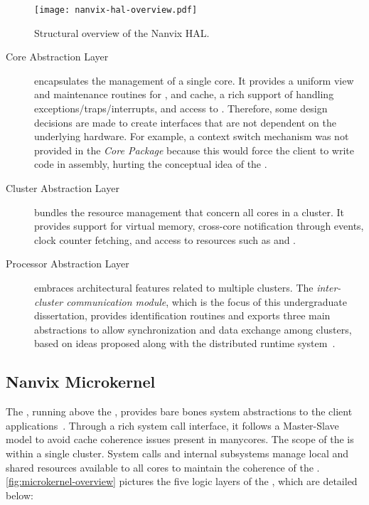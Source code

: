 		\begin{figure}[!tb]
			\centering%
			\caption{Structural overview of the Nanvix HAL.}%
			\label{fig:hal-overview}%
			\texttt{[image: nanvix-hal-overview.pdf]}%
		\end{figure}

		\begin{description}

			\item[Core Abstraction Layer]
				encapsulates the management of a single core.
				It provides a uniform view and maintenance routines for \tlbs, \mmu and cache,
				a rich support of handling exceptions/traps/interrupts, and
				access to \pmio.
				Therefore, some design decisions are made to create interfaces that are not
				dependent on the underlying hardware.
				For example, a context switch mechanism was not provided in the
				\textit{Core Package} because this would force the client \os
				to write code in assembly, hurting the conceptual idea of the \hal.

			\item[Cluster Abstraction Layer]
				bundles the resource management that concern all cores in a cluster.
				It provides support for virtual memory, cross-core notification through events,
				clock counter fetching, and access to \io resources such as \mmio and \dma.

			\item[Processor Abstraction Layer]
				embraces architectural features related to multiple clusters.
				The \textit{inter-cluster communication module}, which is the focus of
				this undergraduate dissertation, provides \noc identification routines and
				exports three main abstractions to allow synchronization and data
				exchange among clusters, based on ideas proposed along with the
				\nodeos distributed runtime system~\cite{DeDinechin2013-1}.

		\end{description}

	\subsection{Nanvix Microkernel}
	\label{sec.microkernel}

		The \textit{\nanvix \microkernel}, running above the \hal, provides
		bare bones system abstractions to the client applications~\cite{penna:sbesc19}.
		Through a rich system call interface, it follows a Master-Slave \os model
		to avoid cache coherence issues present in manycores.
		The scope of the \microkernel is within a single cluster.
		System calls and internal subsystems manage local and shared resources
		available to all cores to maintain the coherence of the \os.
		\autoref{fig:microkernel-overview} pictures the five logic layers of the \microkernel,
		which are detailed below:

